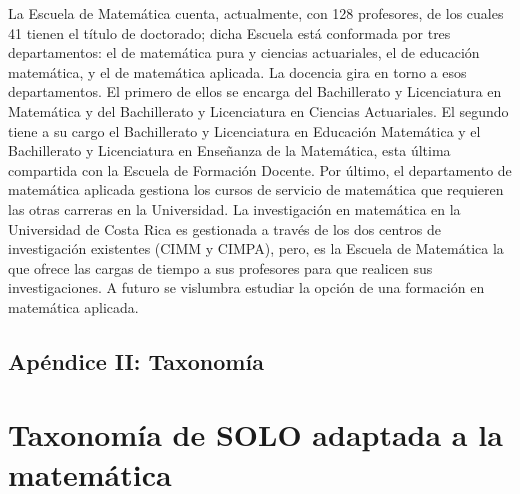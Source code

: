 La Escuela de Matemática cuenta, actualmente, con 128 profesores, de los cuales 41 tienen el título de doctorado; dicha Escuela está conformada por tres departamentos: el de matemática pura y ciencias actuariales, el de educación matemática, y el de matemática aplicada. La docencia gira en torno a esos departamentos. El primero de ellos se encarga del Bachillerato y Licenciatura en Matemática y del Bachillerato y Licenciatura en Ciencias Actuariales. El segundo tiene a su cargo el Bachillerato y Licenciatura en Educación Matemática y el Bachillerato y Licenciatura en Enseñanza de la Matemática, esta última compartida con la Escuela de Formación Docente. Por último, el departamento de matemática aplicada gestiona los cursos de servicio de matemática que requieren las otras carreras en la Universidad. La investigación en matemática en la Universidad de Costa Rica es gestionada a través de los dos centros de investigación existentes (CIMM y CIMPA), pero, es la Escuela de Matemática la que ofrece las cargas de tiempo a sus profesores para que realicen sus investigaciones. A futuro se vislumbra estudiar la opción de una formación en matemática aplicada.

\section{Apéndice II: Taxonomía}

\chapter{Taxonomía de SOLO adaptada a la matemática}

